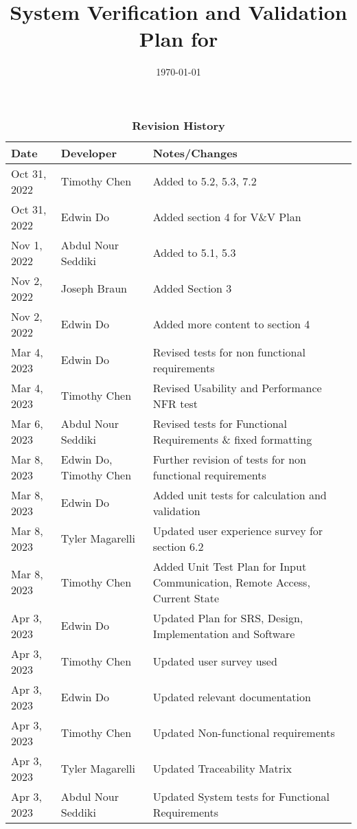 \documentclass[12pt, titlepage]{article}
\begin{document}
\title{System Verification and Validation Plan for \progname{}} 
\author{\authname}
\date{\today}
	
\maketitle


\begin{table}[H]
  \caption{\bf Revision History}
  \begin{tabularx}{\textwidth}{p{2.5cm}p{2.5cm}X}
  \toprule {\bf Date} & {\bf Developer} & {\bf Notes/Changes}\\
  \midrule
  Oct 31, 2022 & Timothy Chen & Added to 5.2, 5.3, 7.2\\
  Oct 31, 2022 & Edwin Do & Added section 4 for V\&V Plan\\
  Nov 1, 2022 & Abdul Nour Seddiki & Added to 5.1, 5.3\\
  Nov 2, 2022 & Joseph Braun & Added Section 3\\
  Nov 2, 2022 & Edwin Do & Added more content to section 4 \\
  Mar 4, 2023 & Edwin Do & Revised tests for non functional requirements\\
  Mar 4, 2023 & Timothy Chen & Revised Usability and Performance NFR test\\
  Mar 6, 2023 & Abdul Nour Seddiki & Revised tests for Functional Requirements \& fixed formatting\\
  Mar 8, 2023 & Edwin Do, Timothy Chen & Further revision of tests for non functional requirements\\
  Mar 8, 2023 & Edwin Do & Added unit tests for calculation and validation\\
  Mar 8, 2023 & Tyler Magarelli & Updated user experience survey for section 6.2\\
  Mar 8, 2023 & Timothy Chen & Added Unit Test Plan for Input Communication, Remote Access, Current State\\
  Apr 3, 2023 & Edwin Do & Updated Plan for SRS, Design, Implementation and Software\\
  Apr 3, 2023 & Timothy Chen & Updated user survey used\\
  Apr 3, 2023 & Edwin Do & Updated relevant documentation\\
  Apr 3, 2023 & Timothy Chen & Updated Non-functional requirements\\
  Apr 3, 2023 & Tyler Magarelli & Updated Traceability Matrix\\
  Apr 3, 2023 & Abdul Nour Seddiki & Updated System tests for Functional Requirements\\
  \bottomrule
  \end{tabularx}
  \end{table}
  
\end{document}
